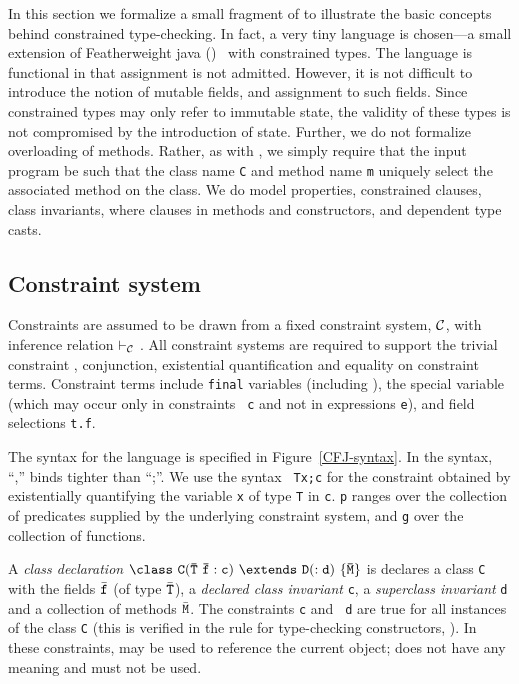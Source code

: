 In this section we formalize a small fragment of \Xten{} to illustrate
the basic concepts behind constrained type-checking.  In fact, a very
tiny language is chosen---a small extension of Featherweight
java (\FJ{})~\cite{FJ} with constrained
types. 
%
The language is functional in that assignment is not
admitted. However, it is not difficult to introduce the notion of
mutable fields, and assignment to such fields. Since constrained types
may only refer to immutable state, the validity of these types is not
compromised by the introduction of state.
%
Further, we do not formalize overloading of methods. Rather, as
with \FJ{}, we simply require that the input program be such that the class
name {\tt C} and method name {\tt m} uniquely select the associated
method on the class. 
%
We do model properties, constrained clauses, class invariants, where
clauses in methods and constructors, and dependent type casts.

\subsection{Constraint system}

Constraints are assumed to be drawn from a fixed constraint system,
$\cal C$, with inference relation $\vdash_{\cal C}$ \cite{CCCC}.
All
constraint systems are required to support the trivial constraint
\true, conjunction, existential quantification and equality on
constraint terms. Constraint terms include {\tt final} variables
(including \this), the
special variable \self (which may occur only in constraints {\tt
c} and not in expressions {\tt e}), and field selections {\tt t.f}. 

The syntax for the language is specified in Figure~\ref{CFJ-syntax}.
In the syntax, ``,'' binds tighter than ``;''. We use the syntax {\tt
{\tt T\;x};\;c} for the constraint obtained by existentially quantifying the
variable {\tt x} of type {\tt T} in {\tt c}. {\tt p} ranges over
the collection of predicates supplied by the underlying constraint
system, and {\tt g} over the collection of functions.

A {\em class declaration} $\tt\class \ C(\bar{T}\ \bar{f}:c)\ \extends\ D(:d)\
\{\bar{M}\}$ is declares a class {\tt C} with the
fields $\bar{\tt f}$ (of type $\bar{\tt T}$), a {\em declared class
invariant} {\tt c}, a {\em superclass invariant} {\tt d} and a
collection of methods $\bar{\tt M}$. The constraints {\tt c} and {\tt
d} are true for all instances of the class {\tt C} (this is verified
in the rule for type-checking constructors, \rn{T-New}).  In these
constraints, \this may be used to reference the current object;
\self{} does not have any meaning and must not be used.

